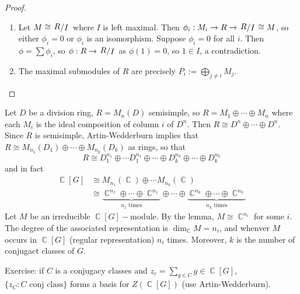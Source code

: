 \documentclass[11pt, a4paper]{memoir}
\DeclareMathOperator{\C}{{\mathbb{C}}}
\theoremstyle{change}
\theoremstyle{plain}
\theoremstyle{nonumberplain}
\newtheorem{proof}{Proof}
\newcommand{\quot}[2]{\mathchoice{\left.\raisebox{0.14em}{$#1$}\middle/\raisebox{-0.14em}{$#2$}\right.}
                                 {\left.\raisebox{0.08em}{$#1$}\middle/\raisebox{-0.08em}{$#2$}\right.}
                                 {\left.\raisebox{0.03em}{$#1$}\middle/\raisebox{-0.03em}{$#2$}\right.}
                                 {\left.\raisebox{0em}{$#1$}\middle/\raisebox{0em}{$#2$}\right.}}
\numberwithin{equation}{section}
\begin{document}
\begin{proof}
    \begin{enumerate}[nl,r]
        \item Let $M\cong\quot{R}{I}$ where $I$ is left maximal.
            Then $\phi_i:M_i\to R\to\quot{R}{I}\cong M$, so either $\phi_i=0$ or $\phi_i$ is an isomorphism.
            Suppose $\phi_i=0$ for all $i$.
            Then $\phi=\sum\phi_i$, so $\phi:R\to\quot{R}{I}$ as $\phi(1)=0$, so $1\in I$, a contradiction.
        \item The maximal submodules of $R$ are precisely $P_i:=\bigoplus_{j\neq i}M_j$.
    \end{enumerate}
\end{proof}
Let $D$ be a division ring, $R=M_n(D)$ semisimple, so $R=M_1\oplus\cdots\oplus M_n$ where each $M_i$ is the ideal composition of column $i$ of $D^n$.
Then $R\cong D^n\oplus\cdots\oplus D^n$.
Since $R$ is semisimple, Artin-Wedderburn implies that $R\cong M_{n_1}(D_1)\oplus\cdots\oplus M_{n_k}(D_k)$ as rings, so that
\begin{equation*}
    R\cong D_1^{n_1}\oplus\cdots D_1^{n_1}\oplus\cdots\oplus D_k^{n_k}\oplus\cdots\oplus D_k^{n_k}
\end{equation*}
and in fact
\begin{align*}
    \C[G] &\cong M_{n_1}(\C)\oplus\cdots M_{n_k}(\C)\\
          &\cong \underbrace{\C^{n_1}\oplus\cdots\oplus\C^{n_1}}_{n_1\text{ times}}\oplus\cdots\oplus\underbrace{\C^{n_k}\oplus\cdots\oplus\C^{n_k}}_{n_k\text{ times}}
\end{align*}
Let $M$ be an irreducible $\C[G]-$module.
By the lemma, $M\cong\C^{n_i}$ for some $i$.
The degree of the associated representation is $\dim_{\C}M=n_i$, and whenver $M$ occurs in $\C[G]$ (regular representation) $n_i$ times.
Moreover, $k$ is the number of conjugact classes of $G$.

Exercise: if $C$ is a conjugacy classes and $z_c=\sum_{g\in C}g\in\C[G]$, $\{z_C:C\text{ conj class}\}$ forms a basis for $Z(\C[G])$ (use Artin-Wedderburn).
\end{document}
